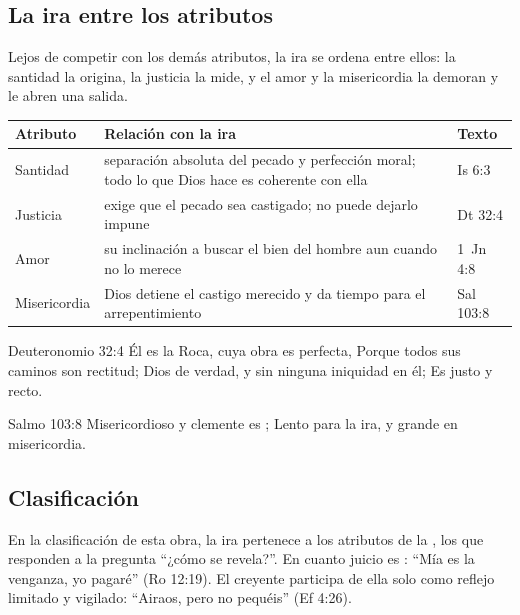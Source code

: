 
\subsection{La ira entre los atributos}
Lejos de competir con los demás atributos, la ira se ordena entre ellos: la santidad la origina, la justicia la mide, y el amor y la misericordia la demoran y le abren una salida.

\begin{center}\small\renewcommand{\arraystretch}{1.25}
\begin{tabular}{@{}L{2.8cm}L{8.2cm}L{3.4cm}@{}}
\toprule
\textbf{Atributo} & \textbf{Relación con la ira} & \textbf{Texto} \\ \midrule
Santidad & separación absoluta del pecado y perfección moral; todo lo que Dios hace es coherente con ella & Is 6:3 \\
Justicia & exige que el pecado sea castigado; no puede dejarlo impune & Dt 32:4 \\
Amor & su inclinación a buscar el bien del hombre aun cuando no lo merece & 1~Jn 4:8 \\
Misericordia & Dios detiene el castigo merecido y da tiempo para el arrepentimiento & Sal 103:8 \\
\bottomrule
\end{tabular}\end{center}

\begin{verso}{Deuteronomio 32:4}
Él es la Roca, cuya obra es perfecta, Porque todos sus caminos son rectitud; Dios de verdad, y sin ninguna iniquidad en él; Es justo y recto.
\end{verso}

\begin{verso}{Salmo 103:8}
Misericordioso y clemente es \SENOR; Lento para la ira, y grande en misericordia.
\end{verso}

\subsection{Clasificación}
En la clasificación de esta obra, la ira pertenece a los atributos de la , los que responden a la pregunta ``¿cómo se revela?''. En cuanto juicio es : ``Mía es la venganza, yo pagaré'' (Ro 12:19). El creyente participa de ella solo como reflejo limitado y vigilado: ``Airaos, pero no pequéis'' (Ef 4:26).

